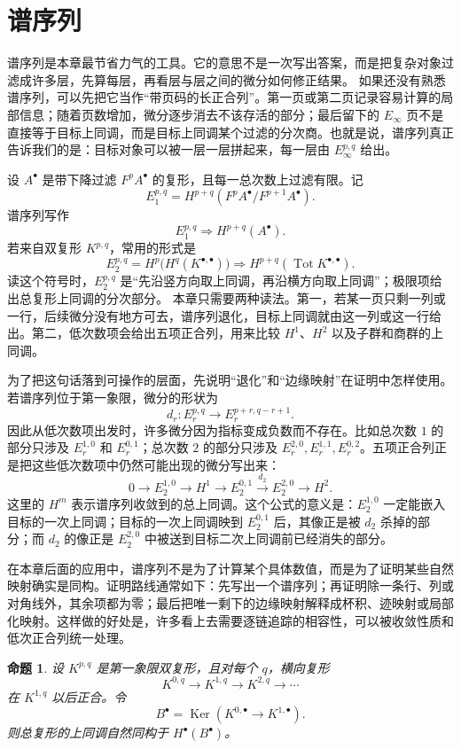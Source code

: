 \documentclass[11pt,a4paper,openany]{ctexbook}
\numberwithin{equation}{chapter}
\newcommand{\Ker}{\operatorname{Ker}}
\theoremstyle{plain}
\newtheorem{proposition}[theorem]{命题}
\theoremstyle{definition}
\theoremstyle{remark}
\begin{document}
\section{谱序列}

谱序列是本章最节省力气的工具。它的意思不是一次写出答案，而是把复杂对象过滤成许多层，先算每层，再看层与层之间的微分如何修正结果。
如果还没有熟悉谱序列，可以先把它当作“带页码的长正合列”。第一页或第二页记录容易计算的局部信息；随着页数增加，微分逐步消去不该存活的部分；最后留下的 $E_\infty$ 页不是直接等于目标上同调，而是目标上同调某个过滤的分次商。也就是说，谱序列真正告诉我们的是：目标对象可以被一层一层拼起来，每一层由 $E_\infty^{p,q}$ 给出。

设 $A^\bullet$ 是带下降过滤 $F^pA^\bullet$ 的复形，且每一总次数上过滤有限。记
\[
E_1^{p,q}=H^{p+q}(F^pA^\bullet/F^{p+1}A^\bullet).
\]
谱序列写作
\[
E_1^{p,q}\Rightarrow H^{p+q}(A^\bullet).
\]
若来自双复形 $K^{p,q}$，常用的形式是
\[
E_2^{p,q}=H^p\bigl(H^q(K^{\bullet,\bullet})\bigr)
\Rightarrow H^{p+q}(\operatorname{Tot}K^{\bullet,\bullet}).
\]
读这个符号时，$E_2^{p,q}$ 是“先沿竖方向取上同调，再沿横方向取上同调”；极限项给出总复形上同调的分次部分。
本章只需要两种读法。第一，若某一页只剩一列或一行，后续微分没有地方可去，谱序列退化，目标上同调就由这一列或这一行给出。第二，低次数项会给出五项正合列，用来比较 $H^1$、$H^2$ 以及子群和商群的上同调。

为了把这句话落到可操作的层面，先说明“退化”和“边缘映射”在证明中怎样使用。若谱序列位于第一象限，微分的形状为
\[
d_r:E_r^{p,q}\longrightarrow E_r^{p+r,q-r+1}.
\]
因此从低次数项出发时，许多微分因为指标变成负数而不存在。比如总次数 $1$ 的部分只涉及 $E_r^{1,0}$ 和 $E_r^{0,1}$；总次数 $2$ 的部分只涉及 $E_r^{2,0},E_r^{1,1},E_r^{0,2}$。五项正合列正是把这些低次数项中仍然可能出现的微分写出来：
\[
0\to E_2^{1,0}\to H^1\to E_2^{0,1}\xrightarrow{d_2}E_2^{2,0}\to H^2.
\]
这里的 $H^m$ 表示谱序列收敛到的总上同调。这个公式的意义是：$E_2^{1,0}$ 一定能嵌入目标的一次上同调；目标的一次上同调映到 $E_2^{0,1}$ 后，其像正是被 $d_2$ 杀掉的部分；而 $d_2$ 的像正是 $E_2^{2,0}$ 中被送到目标二次上同调前已经消失的部分。

在本章后面的应用中，谱序列不是为了计算某个具体数值，而是为了证明某些自然映射确实是同构。证明路线通常如下：先写出一个谱序列；再证明除一条行、列或对角线外，其余项都为零；最后把唯一剩下的边缘映射解释成杯积、迹映射或局部化映射。这样做的好处是，许多看上去需要逐链追踪的相容性，可以被收敛性质和低次正合列统一处理。

\begin{proposition}
设 $K^{p,q}$ 是第一象限双复形，且对每个 $q$，横向复形
\[
K^{0,q}\to K^{1,q}\to K^{2,q}\to\cdots
\]
在 $K^{1,q}$ 以后正合。令
\[
B^\bullet=\Ker(K^{0,\bullet}\to K^{1,\bullet}).
\]
则总复形的上同调自然同构于 $H^\bullet(B^\bullet)$。
\end{proposition}
\end{document}
